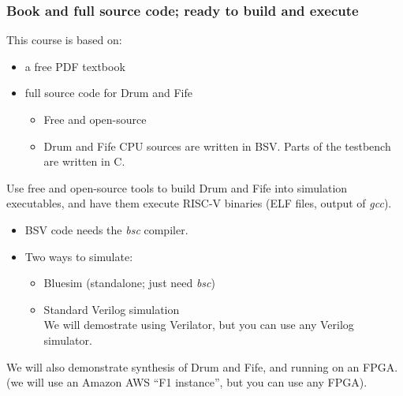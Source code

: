 \begin{frame}
\frametitle{Book and full source code; ready to build and execute}

This course is based on:

\begin{itemize}
\item a free PDF textbook
\item full source code for Drum and Fife
  \begin{itemize}
  \item Free and open-source

  \item Drum and Fife CPU sources are written in BSV.  Parts of the
        testbench are written in C.
  \end{itemize}
\end{itemize}

\pause
\vspace{1ex}

Use free and open-source tools to build Drum and Fife into
simulation executables, and have them execute RISC-V binaries
(ELF files, output of \emph{gcc}).

\begin{itemize}
\item BSV code needs the \emph{bsc} compiler.

\item Two ways to simulate:
  \begin{itemize}
    \item Bluesim (standalone; just need \emph{bsc})
    \item Standard Verilog simulation \\
      We will demostrate using Verilator, but you can use any Verilog simulator.
  \end{itemize}
\end{itemize}

\pause
\vspace{1ex}

We will also demonstrate synthesis of Drum and Fife, and running on an FPGA. \\
(we will use an Amazon AWS ``F1 instance'', but you can use any FPGA).

\end{frame}


